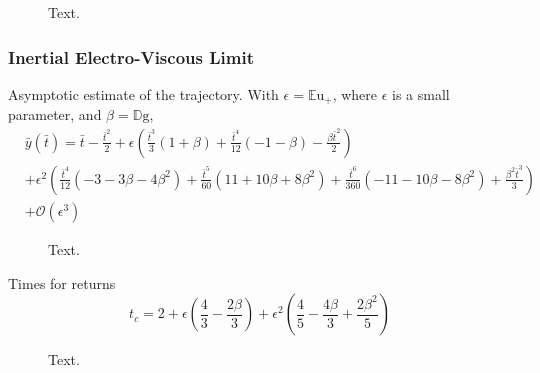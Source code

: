 \documentclass[a4paper, 12pt]{article}
\begin{document}
\newpage
\begin{figure}[htb]
    \centering
    \resizebox{1\textwidth}{!}{}
    \caption{Text.}
    \label{fig:short_times}
\end{figure}

\subsubsection{Inertial Electro-Viscous Limit}
Asymptotic estimate of the trajectory. With $\epsilon = {\mathbb{E}\mbox{u}}_+$, where $\epsilon$ is a small parameter, and $\beta = \mathbb{D}\mbox{g}$,
\begin{eqnarray*}
&\bar{y}(\bar{t}) = \bar{t} - \frac{\bar{t}^{2}}{2} + \epsilon \left(\frac{\bar{t}^{3}}{3} \left(1 + \beta\right) + \frac{\bar{t}^{4}}{12} \left(-1 - \beta\right) - \frac{\beta \bar{t}^{2}}{2}\right)&  \\
&+ \epsilon^{2} \left(\frac{\bar{t}^{4}}{12} \left(-3 - 3 \beta - 4 \beta^{2}\right) + \frac{\bar{t}^{5}}{60} \left(11 + 10 \beta + 8 \beta^{2}\right)+ \frac{\bar{t}^{6}}{360} \left(-11 - 10 \beta - 8 \beta^{2}\right) + \frac{\beta^{2} \bar{t}^{3}}{3}\right)& \\
 &+ \mathcal{O}(\epsilon^3)&
\end{eqnarray*}

\newpage
\begin{figure}[htb]
    \centering
    
    \caption{Text.}
     \label{fig:long_times}
\end{figure}

Times for returns
\[t_c = 2 + \epsilon \left(\frac{4}{3} - \frac{2 \beta}{3}\right) + \epsilon^{2} \left(\frac{4}{5} - \frac{4 \beta}{3} + \frac{2 \beta^{2}}{5}\right)
\]
\begin{figure}[htb]
    \centering
    
    \caption{Text.}
    \label{fig:drag}
\end{figure}
\end{document}
